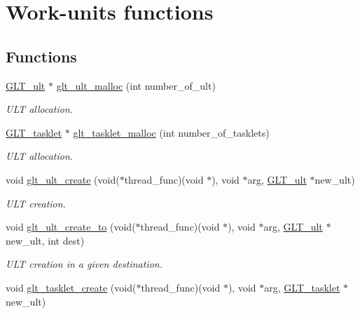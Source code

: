 \hypertarget{group__WORKUNIT}{\section{Work-\/units functions}
\label{group__WORKUNIT}
}
\subsection*{Functions}
\begin{DoxyCompactItemize}
\item 
\hyperlink{group__OBJECTS_gaa560da37f581d1cbf86b736270c7d78c}{G\-L\-T\-\_\-ult} $\ast$ \hyperlink{group__WORKUNIT_gadcd99b3a31062d6f2f106e7d82430c22}{glt\-\_\-ult\-\_\-malloc} (int number\-\_\-of\-\_\-ult)
\begin{DoxyCompactList}\small\item\em U\-L\-T allocation. \end{DoxyCompactList}\item 
\hyperlink{group__OBJECTS_gaea74ef1c9247a6c3f8f9aa243ec3491c}{G\-L\-T\-\_\-tasklet} $\ast$ \hyperlink{group__WORKUNIT_ga7d7a66d109073ceeb2127e125afda4dc}{glt\-\_\-tasklet\-\_\-malloc} (int number\-\_\-of\-\_\-tasklets)
\begin{DoxyCompactList}\small\item\em U\-L\-T allocation. \end{DoxyCompactList}\item 
void \hyperlink{group__WORKUNIT_ga80b172dbf386dc0af178d2fceccebe8c}{glt\-\_\-ult\-\_\-create} (void($\ast$thread\-\_\-func)(void $\ast$), void $\ast$arg, \hyperlink{group__OBJECTS_gaa560da37f581d1cbf86b736270c7d78c}{G\-L\-T\-\_\-ult} $\ast$new\-\_\-ult)
\begin{DoxyCompactList}\small\item\em U\-L\-T creation. \end{DoxyCompactList}\item 
void \hyperlink{group__WORKUNIT_ga93c60b3bcaf218ece53c593018d1c22b}{glt\-\_\-ult\-\_\-create\-\_\-to} (void($\ast$thread\-\_\-func)(void $\ast$), void $\ast$arg, \hyperlink{group__OBJECTS_gaa560da37f581d1cbf86b736270c7d78c}{G\-L\-T\-\_\-ult} $\ast$new\-\_\-ult, int dest)
\begin{DoxyCompactList}\small\item\em U\-L\-T creation in a given destination. \end{DoxyCompactList}\item 
void \hyperlink{group__WORKUNIT_ga9aafb998799703550b114e934e62d300}{glt\-\_\-tasklet\-\_\-create} (void($\ast$thread\-\_\-func)(void $\ast$), void $\ast$arg, \hyperlink{group__OBJECTS_gaea74ef1c9247a6c3f8f9aa243ec3491c}{G\-L\-T\-\_\-tasklet} $\ast$new\-\_\-ult)

\end{DoxyCompactItemize}
